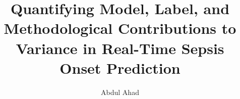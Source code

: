 
\usepackage[utf8]{inputenc}
\usepackage[T1]{fontenc}
\usepackage[english]{babel}
\usepackage{amsmath,amssymb}
\usepackage{graphicx}
\usepackage{booktabs}
\usepackage{tabularx}
\usepackage{multirow}
\usepackage{multicol}
\usepackage{tikz}
\usepackage[most]{tcolorbox}
\usepackage{csquotes}
\usepackage[style=ieee,backend=biber,defernumbers=true,doi=false,url=false,isbn=false,eprint=false,maxbibnames=2,minbibnames=1]{biblatex}



\newcommand{\repourl}{https://github.com/ahadarif007/sepsis-variance-decomposition}
\newcommand{\repolink}{\href{\repourl}{\texttt{github.com/ahadarif007/sepsis-variance-decomposition}}}



\title{Quantifying Model, Label, and Methodological Contributions to
       Variance in Real-Time Sepsis Onset Prediction}
\author{Abdul Ahad}
\date{}

